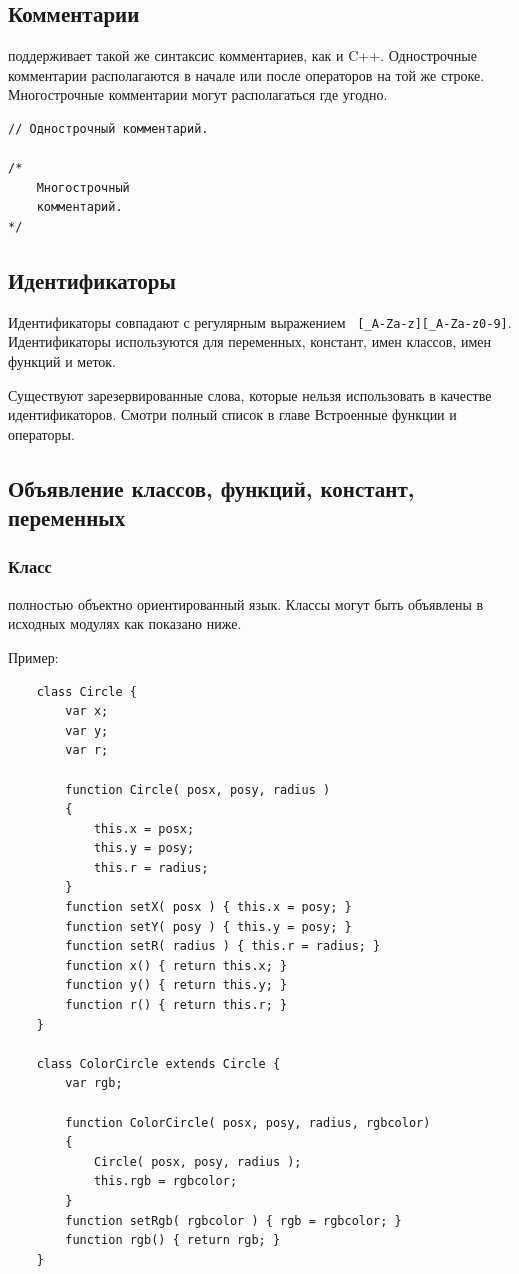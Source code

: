 \documentclass[11pt,russian,a4paper]{article}
\begin{document}
\subsection{Комментарии}

\AS поддерживает такой же синтаксис комментариев, как и C++. Однострочные
комментарии располагаются в начале или после операторов на той же строке.
Многострочные комментарии могут располагаться где угодно.

\begin{verbatim}
// Однострочный комментарий.

/*
    Многострочный
    комментарий.
*/
\end{verbatim}


\subsection{Идентификаторы}

Идентификаторы совпадают с регулярным выражением \verb! [_A-Za-z][_A-Za-z0-9]!.
Идентификаторы используются для переменных, констант, имен классов, имен функций
и меток.

Существуют зарезервированные слова, которые нельзя использовать в качестве
идентификаторов. Смотри полный список в главе {Встроенные функции и операторы}.

\subsection{Объявление классов, функций, констант, переменных}


\subsubsection{Класс}

\AS полностью объектно ориентированный язык. Классы могут быть объявлены
в исходных модулях как показано ниже.

Пример:

\begin{verbatim}
    class Circle {
        var x;
        var y;
        var r;

        function Circle( posx, posy, radius )
        {
            this.x = posx;
            this.y = posy;
            this.r = radius;
        }
        function setX( posx ) { this.x = posy; }
        function setY( posy ) { this.y = posy; }
        function setR( radius ) { this.r = radius; }
        function x() { return this.x; }
        function y() { return this.y; }
        function r() { return this.r; }
    }

    class ColorCircle extends Circle {
        var rgb;

        function ColorCircle( posx, posy, radius, rgbcolor)
        {
            Circle( posx, posy, radius );
            this.rgb = rgbcolor;
        }
        function setRgb( rgbcolor ) { rgb = rgbcolor; }
        function rgb() { return rgb; }
    }

\end{verbatim}
\end{document}
